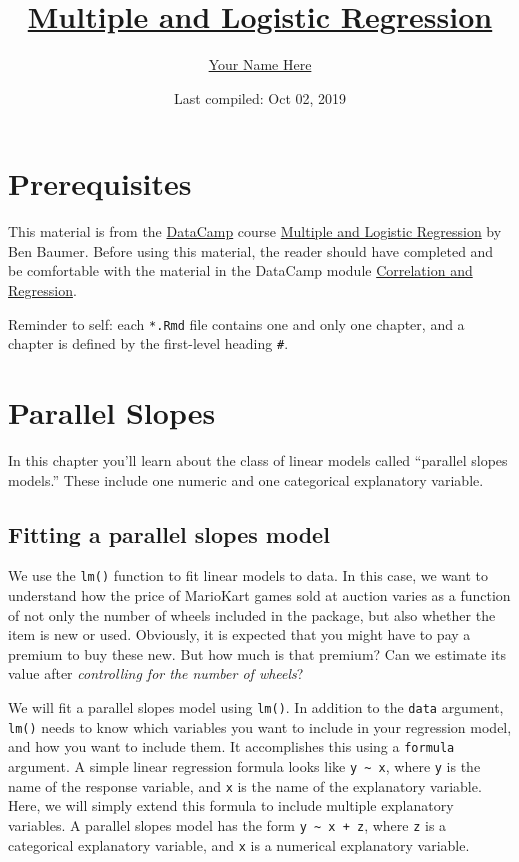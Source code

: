 \documentclass[]{book}
\title{\href{https://www.datacamp.com/courses/multiple-and-logistic-regression}{Multiple
and Logistic Regression}}
\author{\href{https://your_username.github.io/}{Your Name Here}}
\date{Last compiled: Oct 02, 2019}
\begin{document}
\maketitle

{
\setcounter{tocdepth}{1}
\tableofcontents
}
\chapter{Prerequisites}\label{prerequisites}

This material is from the \href{https://www.datacamp.com}{DataCamp}
course
\href{https://www.datacamp.com/courses/multiple-and-logistic-regression}{Multiple
and Logistic Regression} by Ben Baumer. Before using this material, the
reader should have completed and be comfortable with the material in the
DataCamp module
\href{https://www.datacamp.com/courses/correlation-and-regression}{Correlation
and Regression}.

Reminder to self: each \texttt{*.Rmd} file contains one and only one
chapter, and a chapter is defined by the first-level heading
\texttt{\#}.

\chapter{Parallel Slopes}\label{parallel-slopes}

In this chapter you'll learn about the class of linear models called
``parallel slopes models.'' These include one numeric and one
categorical explanatory variable.

\section{Fitting a parallel slopes
model}\label{fitting-a-parallel-slopes-model}

We use the \texttt{lm()} function to fit linear models to data. In this
case, we want to understand how the price of MarioKart games sold at
auction varies as a function of not only the number of wheels included
in the package, but also whether the item is new or used. Obviously, it
is expected that you might have to pay a premium to buy these new. But
how much is that premium? Can we estimate its value after
\emph{controlling for the number of wheels}?

We will fit a parallel slopes model using \texttt{lm()}. In addition to
the \texttt{data} argument, \texttt{lm()} needs to know which variables
you want to include in your regression model, and how you want to
include them. It accomplishes this using a \texttt{formula} argument. A
simple linear regression formula looks like
\texttt{y\ \textasciitilde{}\ x}, where \texttt{y} is the name of the
response variable, and \texttt{x} is the name of the explanatory
variable. Here, we will simply extend this formula to include multiple
explanatory variables. A parallel slopes model has the form
\texttt{y\ \textasciitilde{}\ x\ +\ z}, where \texttt{z} is a
categorical explanatory variable, and \texttt{x} is a numerical
explanatory variable.
\end{document}
